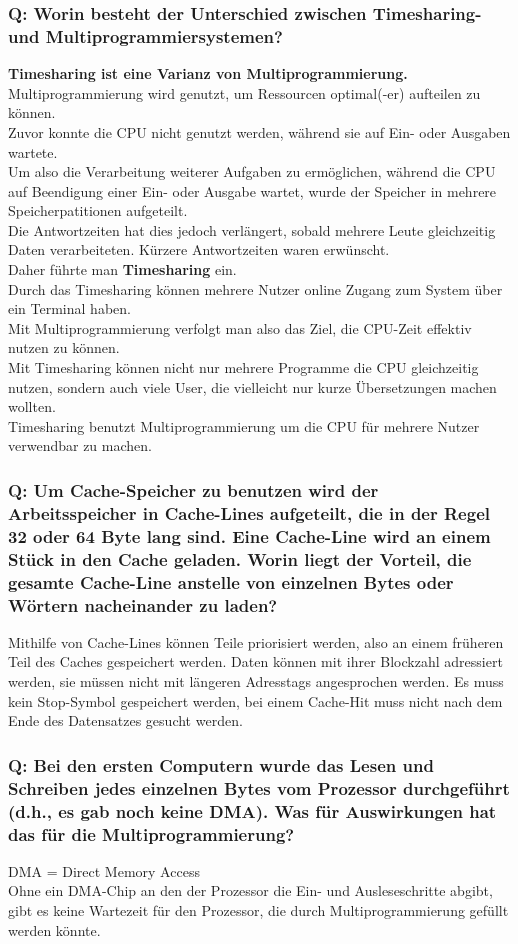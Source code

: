 \documentclass[12pt,a4paper]{univention}
\begin{document}
\subsubsection{Q: Worin besteht der Unterschied zwischen Timesharing- und Multiprogrammiersystemen?}
\textbf{Timesharing ist eine Varianz von Multiprogrammierung.}\\
Multiprogrammierung wird genutzt, um Ressourcen optimal(-er) aufteilen zu können. \\
Zuvor konnte die CPU nicht genutzt werden, während sie auf Ein- oder Ausgaben wartete. \\
Um also die Verarbeitung weiterer Aufgaben zu ermöglichen, während die CPU auf Beendigung einer Ein- oder Ausgabe wartet, wurde der Speicher in mehrere Speicherpatitionen aufgeteilt. \\
Die Antwortzeiten hat dies jedoch verlängert, sobald mehrere Leute gleichzeitig Daten verarbeiteten. Kürzere Antwortzeiten waren erwünscht.\\
Daher führte man \textbf{Timesharing} ein.\\
Durch das Timesharing können mehrere Nutzer online Zugang zum System über ein Terminal haben.\\
Mit Multiprogrammierung verfolgt man also das Ziel, die CPU-Zeit effektiv nutzen zu können.\\
Mit Timesharing können nicht nur mehrere Programme die CPU gleichzeitig nutzen, sondern auch viele User, die vielleicht nur kurze Übersetzungen machen wollten.\\ Timesharing benutzt Multiprogrammierung um die CPU für mehrere Nutzer verwendbar zu machen.
\subsubsection{Q: Um Cache-Speicher zu benutzen wird der Arbeitsspeicher in Cache-Lines aufgeteilt, die in der Regel 32 oder 64 Byte lang sind. Eine Cache-Line wird an einem Stück in den Cache geladen. Worin liegt der Vorteil, die gesamte Cache-Line anstelle von einzelnen Bytes oder Wörtern nacheinander zu laden?}
Mithilfe von Cache-Lines können Teile priorisiert werden, also an einem früheren Teil des Caches gespeichert werden. Daten können mit ihrer Blockzahl adressiert werden, sie müssen nicht mit längeren Adresstags angesprochen werden.
Es muss kein Stop-Symbol gespeichert werden, bei einem Cache-Hit muss nicht nach dem Ende des Datensatzes gesucht werden.
\subsubsection{Q: Bei den ersten Computern wurde das Lesen und Schreiben jedes einzelnen Bytes vom Prozessor durchgeführt (d.h., es gab noch keine DMA). Was für Auswirkungen hat das für die Multiprogrammierung?}
DMA = Direct Memory Access\\
Ohne ein DMA-Chip an den der Prozessor die Ein- und Ausleseschritte abgibt, gibt es keine Wartezeit für den Prozessor, die durch Multiprogrammierung gefüllt werden könnte.
\end{document}
